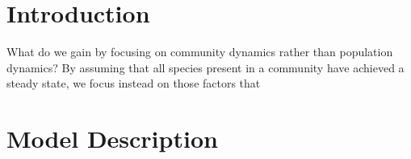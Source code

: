 \documentclass[twocolumn,preprintnumbers,amsmath,amssymb,superscriptaddress]{revtex4}
\begin{document}
\maketitle

\section*{Introduction}













What do we gain by focusing on community dynamics rather than population dynamics?
By assuming that all species present in a community have achieved a steady state, we focus instead on those factors that

\section*{Model Description}
\end{document}
